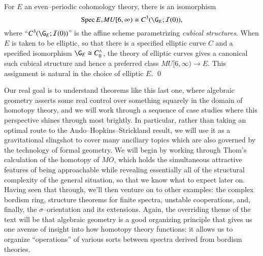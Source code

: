 \begin{theorem}\label{IntroAHSMU6Thm}
For $E$ an even--periodic cohomology theory, there is an isomorphism \[\Spec E_* MU[6, \infty) \cong C^3(\G_E; \sheaf I(0)),\] where ``$C^3(\G_E; \sheaf I(0))$'' is the affine scheme parametrizing \textit{cubical structures}.  When $E$ is taken to be elliptic, so that there is a specified elliptic curve $C$ and a specified isomorphism $\G_E \cong C^\wedge_0$, the theory of elliptic curves gives a canonical such cubical structure and hence a preferred class $MU[6, \infty) \to E$.  This assignment is natural in the choice of elliptic $E$. \qed
\end{theorem}

Our real goal is to understand theorems like this last one, where algebraic geometry asserts some real control over something squarely in the domain of homotopy theory, and we will work through a sequence of case studies where this perspective shines through most brightly.  In particular, rather than taking an optimal route to the Ando--Hopkins--Strickland result, we will use it as a gravitational slingshot to cover many anciliary topics which are also governed by the technology of formal geometry.  We will begin by working through Thom's calculation of the homotopy of $MO$, which holds the simultaneous attractive features of being approachable while revealing essentially all of the structural complexity of the general situation, so that we know what to expect later on.  Having seen that through, we'll then venture on to other examples: the complex bordism ring, structure theorems for finite spectra, unstable cooperations, and, finally, the $\sigma$--orientation and its extensions.  Again, the overriding theme of the text will be that algebraic geometry is a good organizing principle that gives us one avenue of insight into how homotopy theory functions: it allows us to organize ``operations'' of various sorts between spectra derived from bordism theories.

